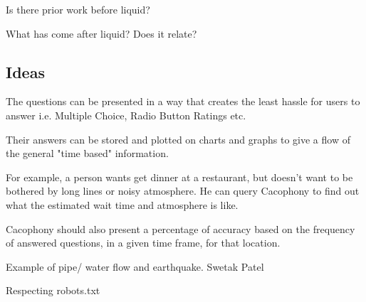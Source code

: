 Is there prior work before liquid?

What has come after liquid?  Does it relate?
\cite{Hong2004}



\subsection{Ideas}

The questions can be presented in a way that creates the least hassle for users
to answer i.e. Multiple Choice, Radio Button Ratings etc.

Their answers can be
stored and plotted on charts and graphs to give a flow of the general "time
based" information. 

For
example, a person wants get dinner at a restaurant, but doesn't want to be
bothered by long lines or noisy atmosphere. He can query Cacophony to find out
what the estimated wait time and atmosphere is like. 

Cacophony should also
present a percentage of accuracy based on the frequency of answered questions,
in a given time frame, for that location.



Example of pipe/ water flow and earthquake.
Swetak Patel

Respecting robots.txt


